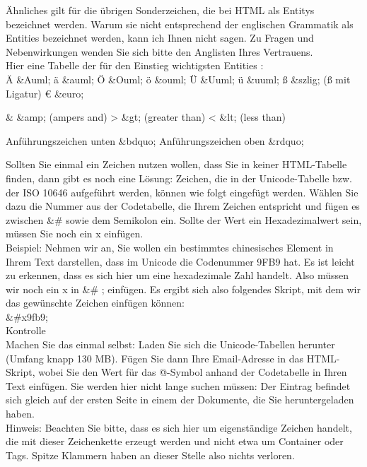 Ähnliches gilt für die übrigen Sonderzeichen, die bei HTML als Entitys bezeichnet werden. Warum sie nicht entsprechend der englischen Grammatik als Entities bezeichnet werden, kann ich Ihnen nicht sagen. Zu Fragen und Nebenwirkungen wenden Sie sich bitte den Anglisten Ihres Vertrauens.\\

Hier eine Tabelle der für den Einstieg wichtigsten Entities :\\

Ä	\&Auml;	
ä	\&auml;	
Ö	\&Ouml;	
ö	\&ouml;	
Ü	\&Uuml;	
ü	\&uuml;	
ß	\&szlig;	(ß mit Ligatur)
€	\&euro;	

\&	\&amp;	(ampers and)
>	\&gt;	(greater than)
<	\&lt;	(less than)

Anführungszeichen unten	\&bdquo;	
Anführungszeichen oben	\&rdquo;	

Sollten Sie einmal ein Zeichen nutzen wollen, dass Sie in keiner HTML-Tabelle finden, dann gibt es noch eine Lösung: Zeichen, die in der Unicode-Tabelle bzw. der ISO 10646  aufgeführt werden, können wie folgt eingefügt werden. Wählen Sie dazu die Nummer aus der Codetabelle, die Ihrem Zeichen entspricht und fügen es zwischen \&\# sowie dem Semikolon ein. Sollte der Wert ein Hexadezimalwert sein, müssen Sie noch ein x einfügen.\\

Beispiel: Nehmen wir an, Sie wollen ein bestimmtes chinesisches Element in Ihrem Text darstellen, dass im Unicode die Codenummer 9FB9 hat. Es ist leicht zu erkennen, dass es sich hier um eine hexadezimale Zahl handelt. Also müssen wir noch ein x in \&\#    ; einfügen. Es ergibt sich also folgendes Skript, mit dem wir das gewünschte Zeichen einfügen können:\\

\&\#x9fb9;\\

Kontrolle\\

Machen Sie das einmal selbst: Laden Sie sich die Unicode-Tabellen herunter (Umfang knapp 130 MB). Fügen Sie dann Ihre Email-Adresse in das HTML-Skript, wobei Sie den Wert für das @-Symbol anhand der Codetabelle in Ihren Text einfügen. Sie werden hier nicht lange suchen müssen: Der Eintrag befindet sich gleich auf der ersten Seite in einem der Dokumente, die Sie heruntergeladen haben.\\

Hinweis: Beachten Sie bitte, dass es sich hier um eigenständige Zeichen handelt, die mit dieser Zeichenkette erzeugt werden und nicht etwa um Container oder Tags. Spitze Klammern haben an dieser Stelle also nichts verloren.

